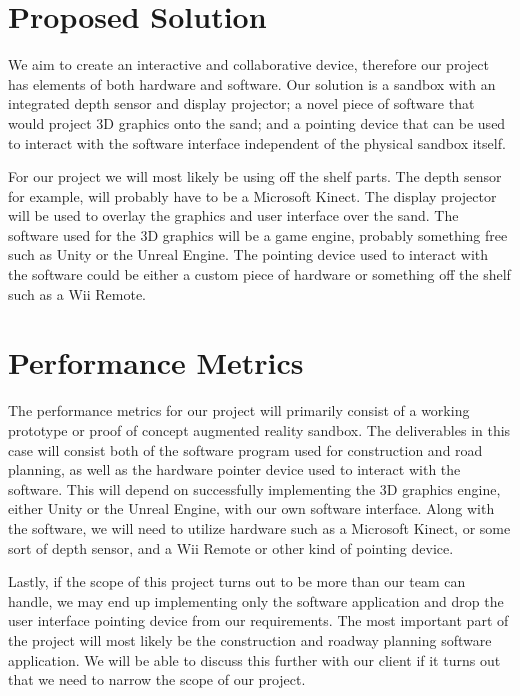 \documentclass[onecolumn, draftclsnofoot,10pt, compsoc]{IEEEtran}
\begin{document}
\section{Proposed Solution}
We aim to create an interactive and collaborative device, therefore our project has elements of both hardware and software.
Our solution is a sandbox with an integrated depth sensor and display projector; a novel piece of software that would project 3D graphics onto the sand; and a pointing device that can be used to interact with the software interface independent of the physical sandbox itself.
\par
For our project we will most likely be using off the shelf parts.
The depth sensor for example, will probably have to be a Microsoft Kinect.
The display projector will be used to overlay the graphics and user interface over the sand.
The software used for the 3D graphics will be a game engine, probably something free such as Unity or the Unreal Engine.
The pointing device used to interact with the software could be either a custom piece of hardware or something off the shelf such as a Wii Remote.

\section{Performance Metrics}
The performance metrics for our project will primarily consist of a working prototype or proof of concept augmented reality sandbox.
The deliverables in this case will consist both of the software program used for construction and road planning, as well as the hardware pointer device used to interact with the software.
This will depend on successfully implementing the 3D graphics engine, either Unity or the Unreal Engine, with our own software interface.
Along with the software, we will need to utilize hardware such as a Microsoft Kinect, or some sort of depth sensor, and a Wii Remote or other kind of pointing device.
\par
Lastly, if the scope of this project turns out to be more than our team can handle, we may end up implementing only the software application and drop the user interface pointing device from our requirements.
The most important part of the project will most likely be the construction and roadway planning software application.
We will be able to discuss this further with our client if it turns out that we need to narrow the scope of our project.
\end{document}
